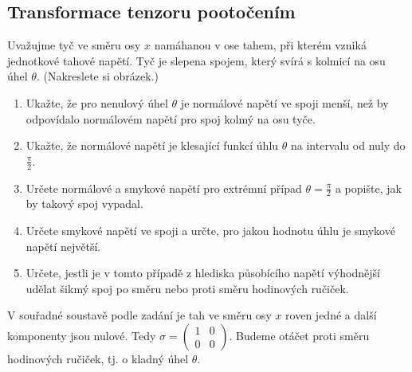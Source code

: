 




\subsection{Transformace tenzoru pootočením}


Uvažujme tyč ve směru osy $x$ namáhanou v ose tahem, při kterém vzniká jednotkové tahové napětí. Tyč je slepena spojem, který svírá s kolmicí na osu úhel $\theta$. (Nakreslete si obrázek.)
\begin{enumerate}
\item Ukažte, že pro nenulový úhel $\theta$ je normálové napětí ve
  spoji menší, než by odpovídalo normálovém napětí pro spoj kolmý na osu tyče.
\item Ukažte, že normálové napětí je klesající funkcí úhlu $\theta$ na intervalu od nuly do $\frac \pi2$.
\item Určete normálové a smykové napětí pro extrémní případ $\theta=\frac \pi 2$ a popište, jak by takový spoj vypadal.
\item Určete smykové napětí ve spoji a určte, pro jakou hodnotu úhlu je smykové napětí největší.
\item Určete, jestli je v tomto případě z hlediska působícího napětí výhodnější udělat šikmý spoj po směru nebo proti směru hodinových ručiček.  
\end{enumerate}

\reseni

V souřadné soustavě podle zadání je tah ve směru osy $x$ roven jedné a další komponenty jsou nulové. Tedy $\sigma=
\begin{pmatrix}
  1 & 0 \\ 0& 0
\end{pmatrix}.
$ Budeme otáčet proti směru hodinových ručiček, tj. o kladný úhel $\theta$.

